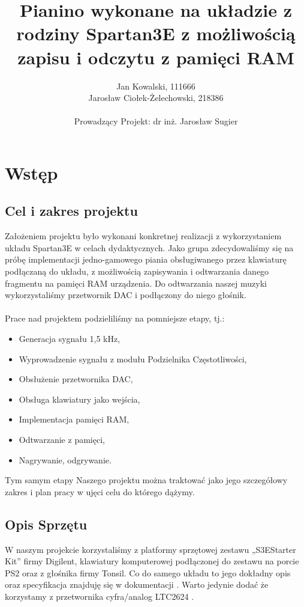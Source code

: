 \documentclass[11pt]{article}
\title{\textbf{Pianino wykonane na układzie z rodziny Spartan3E z możliwością zapisu i odczytu z pamięci RAM}}
\author{Jan Kowalski, 111666\\Jarosław Ciołek-Żelechowski, 218386\\\\Prowadzący Projekt: dr inż. Jarosław Sugier}
\begin{document}
	
	\maketitle
	\newpage
	\tableofcontents
	\newpage
	
	\section{Wstęp}
	\subsection{Cel i zakres projektu}
	Założeniem projektu było wykonani konkretnej realizacji  z wykorzystaniem układu Spartan3E w celach dydaktycznych.  Jako grupa zdecydowaliśmy się na próbę implementacji jedno-gamowego piania obsługiwanego przez klawiaturę podłączaną do układu, z możliwością zapisywania i odtwarzania danego fragmentu na pamięci RAM urządzenia. Do odtwarzania naszej muzyki wykorzystaliśmy przetwornik DAC i podłączony do niego głośnik.\\\\Prace nad projektem podzieliliśmy na pomniejsze etapy, tj.:
	\begin{itemize}[noitemsep]
	\item Generacja sygnału 1,5 kHz,
	\item Wyprowadzenie sygnału z modułu Podzielnika Częstotliwości,
	\item Obsłużenie przetwornika DAC,
	\item Obsługa klawiatury jako wejścia,
	\item Implementacja pamięci RAM,
	\item Odtwarzanie z pamięci,
	\item Nagrywanie, odgrywanie.
	\end{itemize}
	Tym samym etapy Naszego projektu można traktować jako jego szczegółowy zakres i plan pracy w ujęci celu do którego dążymy. 
	
	\subsection{Opis Sprzętu}
	W naszym projekcie korzystaliśmy z platformy sprzętowej zestawu „S3EStarter Kit” firmy Digilent, klawiatury komputerowej podłączonej do zestawu na porcie PS2 oraz z głośnika firmy Tonsil. Co do samego układu to jego dokładny opis oraz specyfikacja znajduję się w dokumentacji \cite{1}. Warto jedynie dodać że korzystamy z przetwornika cyfra/analog LTC2624 \cite{2}.
	
\end{document}
